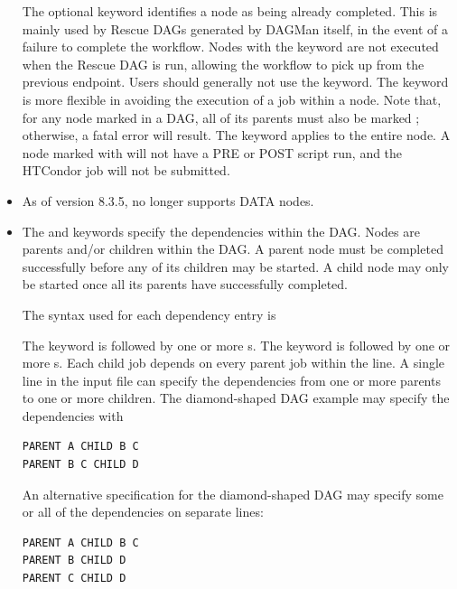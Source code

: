\begin{itemize}
The optional  keyword identifies a node as being already
completed.
This is mainly used by Rescue DAGs generated by DAGMan itself,
in the event of a failure to complete the workflow.
Nodes with the  keyword are not executed when the Rescue DAG is run,
allowing the workflow to pick up from the previous endpoint.  Users
should generally not use the  keyword.
The  keyword is more flexible in avoiding
the execution of a job within a node.
Note that, for any node marked  in a DAG, all of
its parents must also be marked ; 
otherwise, a fatal error will result.
The  keyword applies to the entire node.
A node marked with  will not have a PRE or POST script run,
and the HTCondor job will not be submitted.

\label{dagman:DATA}
\item {}

As of version 8.3.5,  no longer supports DATA nodes.

\label{dagman:ParentChild}
\item {}

The  and  keywords specify the
dependencies within the DAG.
Nodes are parents and/or children within the DAG.
A parent node must be completed successfully before
any of its children may be started.
A child node may only be started once
all its parents have successfully completed.

The syntax used for each dependency entry is

   

The  keyword is followed by one or more
s.
The  keyword is followed by one or more
s.
Each child job depends on every parent job within the line.
A single line in the input file can specify the dependencies from one or more
parents to one or more children.
The diamond-shaped DAG example may specify the dependencies with
\begin{verbatim}
PARENT A CHILD B C
PARENT B C CHILD D
\end{verbatim}
An alternative specification for the diamond-shaped DAG
may specify some or all of the dependencies on separate lines:
\begin{verbatim}
PARENT A CHILD B C
PARENT B CHILD D
PARENT C CHILD D
\end{verbatim}


\end{itemize}
